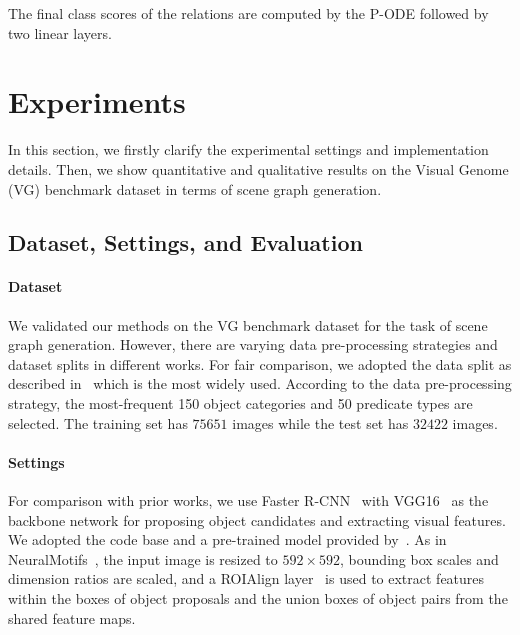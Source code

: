 \documentclass[runningheads]{llncs}
\begin{document}
The final class scores of the relations are computed by the P-ODE followed by two linear layers.


\section{Experiments}
\label{Sec:Exps}

In this section, we firstly clarify the experimental settings
and implementation details. 
Then, we show quantitative and qualitative results on the Visual Genome (VG) benchmark dataset \cite{krishna2017visual} in terms of scene graph generation. 


\subsection{Dataset, Settings, and Evaluation}
\paragraph{Dataset}
We validated our methods on the VG benchmark dataset \cite{krishna2017visual} for the task of scene graph generation.
However, there are varying data pre-processing strategies and dataset splits in different works.
For fair comparison, we adopted the data split as described in~\cite{xu2017scene} which is the most widely used.
According to the data pre-processing strategy, the most-frequent 150 object categories and 50 predicate types are selected. The training set has $75651$ images while the test set has $32422$ images.

\paragraph{Settings}
For comparison with prior works, we use Faster R-CNN~\cite{ren2015faster} with VGG16~\cite{simonyan2014very} as the backbone network for proposing object candidates and extracting visual features.
We adopted the code base and a pre-trained model provided by~\cite{zellers2018neural}.
As in NeuralMotifs~\cite{zellers2018neural}, the input image is resized to $592\times592$, bounding box scales and dimension ratios are scaled, and a ROIAlign layer~\cite{He2017:MaskRCNN} is used to extract features within the boxes of object proposals and the union boxes of object pairs from the shared feature maps. 
\end{document}
